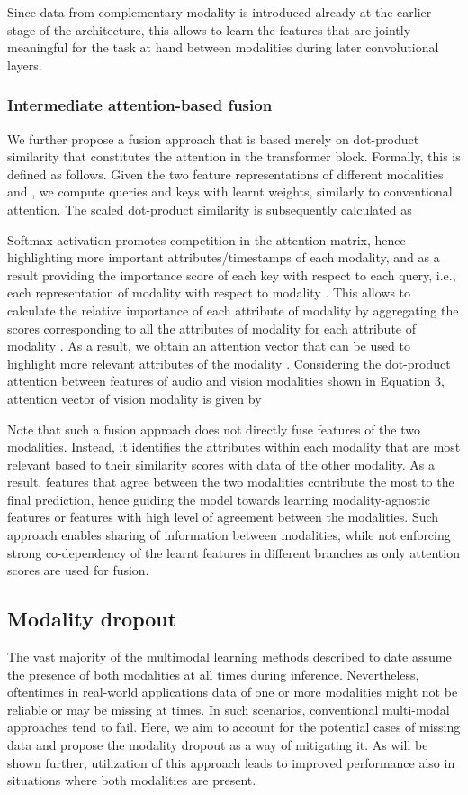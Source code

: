 \documentclass[a4paper,conference]{IEEEtran}
\begin{document}
Since data from complementary modality is introduced already at the earlier stage of the architecture, this allows to learn the features that are jointly meaningful for the task at hand between modalities during later convolutional layers. 


\subsubsection{Intermediate attention-based fusion}

We further propose a fusion approach that is based merely on dot-product similarity that constitutes the attention in the transformer block. Formally, this is defined as follows. Given the two feature representations of different modalities  and , we compute queries and keys with learnt weights, similarly to conventional attention. The scaled dot-product similarity is subsequently calculated as

Softmax activation promotes competition in the attention matrix, hence highlighting more important attributes/timestamps of each modality, and as a result providing the importance score of each key with respect to each query, i.e., each representation of modality  with respect to modality . This allows to calculate the relative importance of each attribute of modality  by aggregating the scores corresponding to all the attributes of modality  for each attribute of modality . As a result, we obtain an attention vector that can be used to highlight more relevant attributes of the modality . Considering the dot-product attention between features of audio and vision modalities shown in Equation 3, attention vector of vision modality is given by 

Note that such a fusion approach does not directly fuse features of the two modalities. Instead, it identifies the attributes within each modality that are most relevant based to their similarity scores with data of the other modality. As a result, features that agree between the two modalities contribute the most to the final prediction, hence guiding the model towards learning modality-agnostic features or features with high level of agreement between the modalities. Such approach enables sharing of information between modalities, while not enforcing strong co-dependency of the learnt features in different branches as only attention scores are used for fusion. 

\subsection{Modality dropout}
The vast majority of the multimodal learning methods described to date assume the presence of both modalities at all times during inference. Nevertheless, oftentimes in real-world applications data of one or more modalities might not be reliable or may be missing at times. In such scenarios, conventional multi-modal approaches tend to fail. Here, we aim to account for the potential cases of missing data and propose the modality dropout as a way of mitigating it. As will be shown further, utilization of this approach leads to improved performance also in situations where both modalities are present. 
\end{document}
